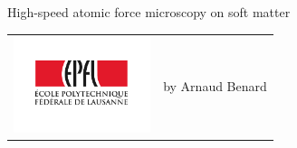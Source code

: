 
\begin{titlepage}
\begin{center}
\sffamily


\null\vspace{2cm}
{\huge High-speed atomic force microscopy on soft matter} \\[24pt] 

\vfill

\begin{tabular} {cc}
\parbox{0.3\textwidth}{\includegraphics[width=4cm]{images/epfl}}
&
\parbox{0.7\textwidth}{%
	
by Arnaud Benard}
\end{tabular}
\end{center}
\vspace{2cm}
\end{titlepage}



